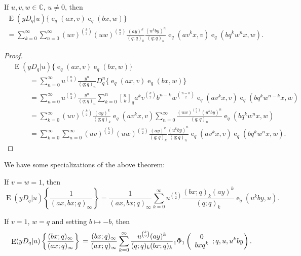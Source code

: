\documentclass{cimart}
\newcommand{\C}{\mathbb{C}}
\newcommand{\qbinom}{\genfrac{[}{]}{0pt}{}}
\DeclareMathOperator{\ope}{e}
\DeclareMathOperator{\opE}{E}
\begin{document}
\begin{theorem}\label{theo_opeE_prod_exp}
If $u,v,w\in\C$, $u\neq0$, then
    \begin{multline}
        \opE(yD_{q}|u)\{\ope_{q}(ax,v)\ope_{q}(bx,w)\}\\
        =\sum_{k=0}^{\infty}\sum_{n=0}^{\infty}(uv)^{\binom{k}{2}}(uw)^{\binom{n}{2}}\frac{(ay)^k}{(q;q)_{k}}\frac{(u^kby)^{n}}{(q;q)_{n}}\ope_{q}(av^kx,v)\ope_{q}(bq^{k}w^{n}x,w).
    \end{multline}
\end{theorem}
\begin{proof}
    \begin{align*}
        &\opE(yD_{q}|u)\{\ope_{q}(ax,v)\ope_{q}(bx,w)\}\\
        &\hspace{1cm}=\sum_{n=0}^{\infty}u^{\binom{n}{2}}\frac{y^n}{(q;q)_{n}}D_{q}^{n}\{\ope_{q}(ax,v)\ope_{q}(bx,w)\}\\
        &\hspace{1cm}=\sum_{n=0}^{\infty}u^{\binom{n}{2}}\frac{y^n}{(q;q)_{n}}\sum_{k=0}^{n}\qbinom{n}{k}_{q}a^kv^{\binom{k}{2}}b^{n-k}w^{\binom{n-k}{2}}\ope_{q}(av^kx,v)\ope_{q}(bq^{k}w^{n-k}x,w)\\
        &\hspace{1cm}=\sum_{k=0}^{\infty}(uv)^{\binom{k}{2}}\frac{(ay)^k}{(q;q)_{k}}\ope_{q}(av^kx,v)\sum_{n=0}^{\infty}\frac{(uw)^{\binom{n}{2}}(u^kby)^{n}}{(q;q)_{n}}\ope_{q}(bq^{k}w^{n}x,w)\\
        &\hspace{1cm}=\sum_{k=0}^{\infty}\sum_{n=0}^{\infty}(uv)^{\binom{k}{2}}(uw)^{\binom{n}{2}}\frac{(ay)^k}{(q;q)_{k}}\frac{(u^kby)^{n}}{(q;q)_{n}}\ope_{q}(av^kx,v)\ope_{q}(bq^{k}w^{n}x,w).
    \end{align*}
\end{proof}
We have some specializations of the above theorem:
\begin{corollary}\label{coro1}
If $v=w=1$, then
\begin{equation}
    \opE(yD_{q}|u)\left\{\frac{1}{(ax,bx;q)_{\infty}}\right\}
        =\frac{1}{(ax,bx;q)_{\infty}}\sum_{k=0}^{\infty}u^{\binom{k}{2}}\frac{(bx;q)_{k}(ay)^k}{(q;q)_{k}}\ope_{q}(u^kby,u).
\end{equation}
\end{corollary}

\begin{corollary}\label{coro2}
If $v=1$, $w=q$ and setting $b\mapsto-b$, then
\begin{equation}\label{eqn_coro2}
    \opE(yD_{q}|u)\left\{\frac{(bx;q)_{\infty}}{(ax;q)_{\infty}}\right\}\\
        =\frac{(bx;q)_{\infty}}{(ax;q)_{\infty}}\sum_{k=0}^{\infty}\frac{u^{\binom{k}{2}}(ay)^k}{(q;q)_{k}(bx;q)_{k}}{}_{1}\Phi_{1}\left(
        \begin{array}{c}
             0 \\
             bxq^k
        \end{array};
        q,u,u^kby
        \right).
\end{equation}
\end{corollary}
\end{document}
